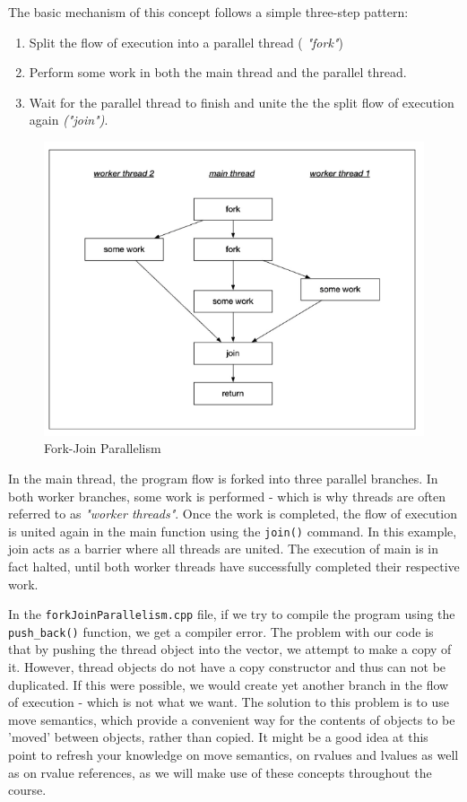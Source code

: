 \documentclass[11pt, a4paper]{article}
\begin{document}
The basic mechanism of this concept follows a simple three-step pattern:

\begin{enumerate}
	\item Split the flow of execution into a parallel thread ( \textit{"fork"})
	\item Perform some work in both the main thread and the parallel thread.
	\item Wait for the parallel thread to finish and unite the the split flow of execution again \textit{("join")}.
\end{enumerate}





\begin{figure}[htpb!]
	\centering
	\includegraphics[width=0.8\linewidth]{fork_join}
	\caption{Fork-Join Parallelism}
	\label{fig:fork_join_parallelism}
\end{figure}


In the main thread, the program flow is forked into three parallel branches. In both worker branches, some work is performed - which is why threads are often referred to as \textit{"worker threads"}. Once the work is completed, the flow of execution is united again in the main function using the \texttt{join()}  command. In this example, join acts as a barrier where all threads are united. The execution of main is in fact halted, until both worker threads have successfully completed their respective work. 



In the \texttt{forkJoinParallelism.cpp} file, if we try to compile the program using the \texttt{push\_back()} function, we get a compiler error. The problem with our code is that by pushing the thread object into the vector, we attempt to make a copy of it. However, thread objects do not have a copy constructor and thus can not be duplicated. If this were possible, we would create yet another branch in the flow of execution - which is not what we want. The solution to this problem is to use move semantics, which provide a convenient way for the contents of objects to be 'moved' between objects, rather than copied. It might be a good idea at this point to refresh your knowledge on move semantics, on rvalues and lvalues as well as on rvalue references, as we will make use of these concepts throughout the course.
\end{document}

